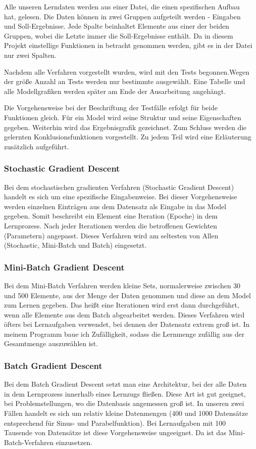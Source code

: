 Alle unseren Lerndaten werden aus einer Datei, die einen spezifischen Aufbau hat, gelesen. Die Daten können in zwei Gruppen aufgeteilt werden - Eingaben und Soll-Ergebnisse. Jede Spalte beinhaltet Elemente aus einer der beiden Gruppen, wobei die Letzte immer die Soll-Ergebnisse enthält. Da in diesem Projekt einstellige Funktionen in betracht genommen werden, gibt es in der Datei nur zwei Spalten.

Nachdem alle Verfahren vorgestellt wurden, wird mit den Tests begonnen.Wegen der größe Anzahl an Tests werden nur bestimmte ausgewählt. Eine Tabelle und alle Modellgrafiken werden später am Ende der Ausarbeitung angehängt. 

Die Vorgehensweise bei der Beschriftung der Testfälle erfolgt für beide Funktionen gleich. Für ein Model wird seine Struktur und seine Eigenschaften gegeben. Weiterhin wird das Ergebnisgrafik gezeichnet. Zum Schluss werden die gelernten Konklusionsfunktionen vorgestellt. Zu jedem Teil wird eine Erläuterung zusätzlich aufgeführt. 
 
\subsubsection{Stochastic Gradient Descent}
Bei dem stochastischen gradienten Verfahren (Stochastic Gradient Descent) handelt es sich um eine spezifische Eingabenweise. Bei dieser Vorgehensweise werden einzelnen Einträgen aus dem Datensatz als Eingabe in das Model gegeben. Somit beschreibt ein Element eine Iteration (Epoche) in dem Lernprozess. Nach jeder Iterationen werden die betroffenen Gewichten (Parametern) angepasst. Dieses Verfahren wird am seltesten von Allen (Stochastic, Mini-Batch und Batch) eingesetzt.


\subsubsection{Mini-Batch Gradient Descent} \label{mini_batch}
Bei dem Mini-Batch Verfahren werden kleine Sets, normalerweise zwischen 30 und 500 Elemente, aus der Menge der Daten genommen und diese an dem Model zum Lernen gegeben. Das heißt eine Iterationen wird erst dann durchgeführt, wenn alle Elemente aus dem Batch abgearbeitet werden. Dieses Verfahren wird öfters bei Lernaufgaben verwendet, bei dennen der Datensatz extrem groß ist. In meinem Programm baue ich Zufälligkeit, sodass die Lernmenge zufällig aus der Gesamtmenge auszuwählen ist.

\subsubsection{Batch Gradient Descent}\label{batch}
Bei dem Batch Gradient Descent setzt man eine Architektur, bei der alle Daten in dem Lernprozess innerhalb eines Lernzugs fließen. Diese Art ist gut geeignet, bei Problemstellungen, wo die Datenbasis angemessen groß ist. In unseren zwei Fällen handelt es sich um relativ kleine Datenmengen (400 und 1000 Datensätze entsprechend für Sinus- und Parabelfunktion). Bei Lernaufgaben mit 100 Tausende von Datensätze ist diese Vorgehensweise ungeeignet. Da ist das Mini-Batch-Verfahren einzusetzen.

